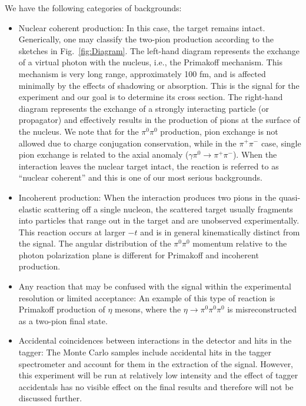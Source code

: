 We have the following categories of backgrounds:
\begin{itemize}
\item Nuclear coherent production: In this case, the target remains
  intact. Generically, one may classify the two-pion production
  according to the sketches in Fig.~\ref{fig:Diagram}. The left-hand
  diagram represents the exchange of a virtual photon with the
  nucleus, i.e., the Primakoff mechanism. This mechanism is very long
  range, approximately 100 fm, and is affected minimally by the
  effects of shadowing or absorption.  This is the signal for the
  experiment and our goal is to determine its cross section.  The
  right-hand diagram represents the exchange of a strongly interacting
  particle (or propagator) and effectively results in the production
  of pions at the surface of the nucleus. We note that for the
  $\pi^0\pi^0$ production, pion exchange is not allowed due to charge
  conjugation conservation, while in the $\pi^+\pi^-$ case, single
  pion exchange is related to the axial anomaly ($\gamma \pi^0
  \rightarrow \pi^+ \pi^-$).  When the interaction leaves the nuclear
  target intact, the reaction is referred to as ``nuclear coherent''
  and this is one of our most serious backgrounds.
\item Incoherent production: When the interaction produces two pions
  in the quasi-elastic scattering off a single nucleon, the scattered
  target usually fragments into particles that range out in the target
  and are unobserved experimentally. This reaction occurs at larger
  $-t$ and is in general kinematically distinct from the signal. The
  angular distribution of the $\pi^0\pi^0$ momentum relative to the
  photon polarization plane is different for Primakoff and incoherent
  production.
\item Any reaction that may be confused with the signal within the
  experimental resolution or limited acceptance: An example of this
  type of reaction is Primakoff production of $\eta$ mesons, where the
  $\eta\rightarrow \pi^0 \pi^0 \pi^0$ is misreconstructed as a
  two-pion final state.
\item Accidental coincidences between interactions in the detector and hits in the tagger: The Monte Carlo samples include accidental hits in the tagger spectrometer and account for them in the extraction of the signal. However, this experiment will be run at relatively low intensity and the effect of tagger accidentals has no visible effect on the final results and therefore will not be discussed further.
\end{itemize}

